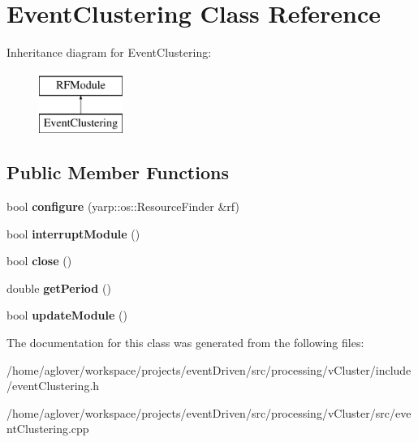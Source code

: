 \hypertarget{classEventClustering}{\section{Event\-Clustering Class Reference}
\label{classEventClustering}
}
Inheritance diagram for Event\-Clustering\-:\begin{figure}[H]
\begin{center}
\leavevmode
\includegraphics[height=2.000000cm]{classEventClustering}
\end{center}
\end{figure}
\subsection*{Public Member Functions}
\begin{DoxyCompactItemize}
\item 
\hypertarget{classEventClustering_a9111f5db3d21a2a80bef0ac5a6996d06}{bool {\bfseries configure} (yarp\-::os\-::\-Resource\-Finder \&rf)}\label{classEventClustering_a9111f5db3d21a2a80bef0ac5a6996d06}

\item 
\hypertarget{classEventClustering_adb2bb1f480ac61629327d5170dd64398}{bool {\bfseries interrupt\-Module} ()}\label{classEventClustering_adb2bb1f480ac61629327d5170dd64398}

\item 
\hypertarget{classEventClustering_af27e70c40cdfddab01c1fffed35620a3}{bool {\bfseries close} ()}\label{classEventClustering_af27e70c40cdfddab01c1fffed35620a3}

\item 
\hypertarget{classEventClustering_afe356ead5fe50d67b2007e3f99f7818f}{double {\bfseries get\-Period} ()}\label{classEventClustering_afe356ead5fe50d67b2007e3f99f7818f}

\item 
\hypertarget{classEventClustering_a25159637f1dc8c9cd27cde191b7296d2}{bool {\bfseries update\-Module} ()}\label{classEventClustering_a25159637f1dc8c9cd27cde191b7296d2}

\end{DoxyCompactItemize}


The documentation for this class was generated from the following files\-:\begin{DoxyCompactItemize}
\item 
/home/aglover/workspace/projects/event\-Driven/src/processing/v\-Cluster/include/event\-Clustering.\-h\item 
/home/aglover/workspace/projects/event\-Driven/src/processing/v\-Cluster/src/event\-Clustering.\-cpp\end{DoxyCompactItemize}
